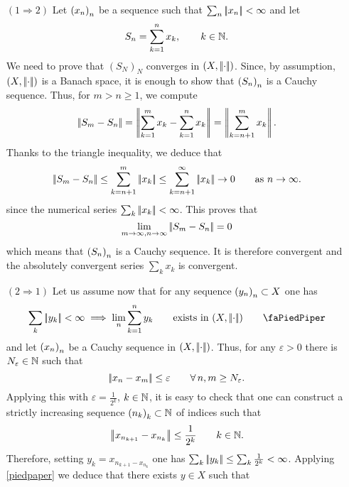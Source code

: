 \documentclass{article}
\begin{document}
\begin{fancyproof}
	\begin{enumerate}
		\item[$(1\Rightarrow 2)$] Let ${\left({x}_{n}\right)}_{n}$ be a sequence such that $\sum_{n}\left|\negthinspace\left|x_{n}\right|\negthinspace\right|<\infty$ and let 
		\begin{equation*}
			S_{n}=\sum_{k=1}^{n}x_{k},\qquad k\in\mathbb{N}.
		\end{equation*}
		We need to prove that ${(S_{N})}_{N}$ converges in $\left(X,\left|\negthinspace\left|\cdot\right|\negthinspace\right|\right)$. Since, by assumption, $(X,\left|\negthinspace\left|\cdot\right|\negthinspace\right|)$ is a Banach space, it is enough to show that ${\left({S}_{n}\right)}_{n}$ is a Cauchy sequence. Thus, for $m>n\geq 1$, we compute
		\begin{equation*}
			\left|\negthinspace\left|S_{m}-S_{n}\right|\negthinspace\right|=\left|\negthinspace\left|\sum_{k=1}^{m}x_{k}-\sum_{k=1}^{n}x_{k}\right|\negthinspace\right|=\left|\negthinspace\left|\sum_{k=n+1}^{m}x_{k}\right|\negthinspace\right|.
		\end{equation*}
		Thanks to the triangle inequality, we deduce that
		\begin{equation*}
			\left|\negthinspace\left|S_{m}-S_{n}\right|\negthinspace\right|\leq\sum_{k=n+1}^{m}\left|\negthinspace\left|x_{k}\right|\negthinspace\right|\leq\sum_{k=n+1}^{\infty}\left|\negthinspace\left|x_{k}\right|\negthinspace\right|\to0\qquad\text{as }n\to\infty.
		\end{equation*}
		since the numerical series $\sum_k\left|\negthinspace\left|x_{k}\right|\negthinspace\right|<\infty$. This proves that
		\begin{equation*}
			\lim_{m\to\infty,n\to\infty}\left|\negthinspace\left|S_{m}-S_{n}\right|\negthinspace\right|=0
		\end{equation*}
		which means that ${\left({S}_{n}\right)}_{n}$ is a Cauchy sequence. It is therefore convergent and the absolutely convergent series $\sum_k x_k$ is convergent.
		\item[$(2\Rightarrow1)$] Let us assume now that for any sequence ${\left({y}_{n}\right)}_{n}\subset X$ one has
		\begin{equation*}
			\sum_k\norm{y_k}<\infty\implies\lim_n\sum_{k=1}^{n}y_k\qquad\text{exists in }(X,\dnorm)\tag*{\faPiedPiper}\label{piedpaper}
		\end{equation*}
		and let ${\left({x}_{n}\right)}_{n}$ be a Cauchy sequence in $\left(X,\left|\negthinspace\left|\cdot\right|\negthinspace\right|\right)$. Thus, for any $\varepsilon>0$ there is $N_\varepsilon\in\mathbb{N}$ such that
		\begin{equation*}
			\left|\negthinspace\left|x_n-x_m\right|\negthinspace\right|\leq\varepsilon\qquad\forall\, n,m\geq N_\varepsilon.
		\end{equation*}
		Applying this with $\varepsilon=\frac{1}{2^{k}}$, $k\in\mathbb{N}$, it is easy to check that one can construct a strictly increasing sequence ${\left({n}_{k}\right)}_{k}\subset\mathbb{N}$ of indices such that
		\begin{equation*}
			\left|\negthinspace\left|x_{n_{k+1}}-x_{n_{k}}\right|\negthinspace\right|\leq\frac{1}{2^{k}}\qquad k\in\mathbb{N}.
		\end{equation*}
		Therefore, setting $y_k=x_{n_{k+1}-x_{n_{k}}}$ one has $\sum_k\left|\negthinspace\left|y_k\right|\negthinspace\right|\leq\sum_k\frac{1}{2^{k}}<\infty$. Applying \ref{piedpaper} we deduce that there exists $y\in X$ such that

\end{enumerate}
\end{fancyproof}
\end{document}
